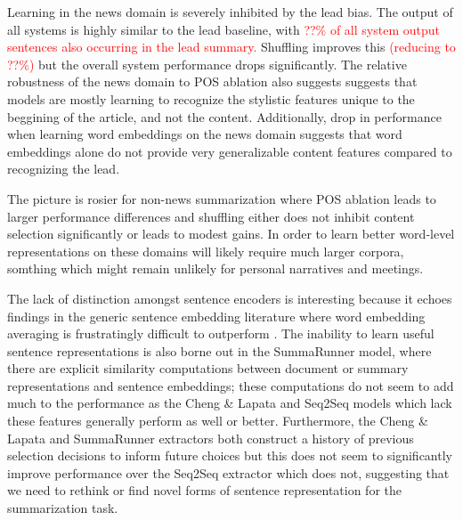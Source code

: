 Learning in the news domain is severely inhibited by the lead bias. 
The output of all systems is highly similar to the lead baseline,
with \textcolor{red}{??\% of all system output sentences also occurring
in the lead summary.} Shuffling improves this 
\textcolor{red}{(reducing to ??\%)} but the overall system performance drops
    significantly.
    The relative robustness of the news domain to POS ablation also suggests
    suggests that models are mostly learning to recognize the stylistic 
    features unique to the beggining of the article, and not the content.
    Additionally, drop in performance when learning word embeddings on 
    the news domain suggests that word embeddings alone do not provide 
    very generalizable content features compared to recognizing the lead.

The picture is rosier for non-news summarization where POS ablation leads
to larger performance differences and shuffling either does not inhibit content
selection significantly or leads to modest gains. In order to learn better
word-level representations on these domains will likely require much
larger corpora, somthing which might remain unlikely for personal narratives
and meetings.



The lack of distinction amongst sentence encoders is interesting because 
it echoes findings in the generic sentence embedding literature 
where word embedding averaging is frustratingly difficult to 
outperform  \cite{wieting2015towards,arora2016simple,wieting2017revisiting}.
The inability to learn useful sentence representations is also 
borne out in the 
SummaRunner model, where there are explicit similarity computations
between document or summary representations and sentence embeddings;
these computations do not seem to add much to the performance as the 
Cheng \& Lapata and Seq2Seq models which lack these features generally
perform as well or better.
Furthermore, the Cheng \& Lapata and SummaRunner extractors both construct
a history of previous selection decisions to inform future choices but this
does not seem to significantly improve performance over the Seq2Seq extractor 
which does not, suggesting that we need to rethink or find novel forms 
of sentence representation for the summarization task.




